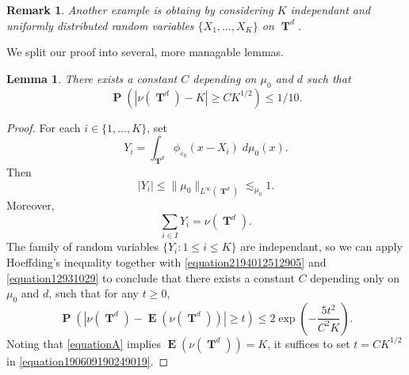 \documentclass[12pt,reqno]{article}
\numberwithin{equation}{section}
\DeclareMathOperator{\TT}{\mathbf{T}}
\newtheorem{lemma}[theorem]{Lemma}
\newtheorem*{remark}{Remark}
\DeclareMathOperator{\EE}{\mathbf{E}}
\DeclareMathOperator{\PP}{\mathbf{P}}
\begin{document}
\begin{remark}
    Another example is obtaing by considering $K$ independant and uniformly distributed random variables $\{ X_1, \dots, X_K \}$ on $\TT^d$.
\end{remark}

We split our proof into several, more managable lemmas.

\begin{lemma} \label{nuboundlemma}
    There exists a constant $C$ depending on $\mu_0$ and $d$ such that
    \[ \PP \left( |\nu(\TT^d) - K | \geq C K^{1/2} \right) \leq 1/10. \]
\end{lemma}
\begin{proof}
    For each $i \in \{ 1, \dots, K \}$, set
    \[ Y_i = \int_{\TT^d} \phi_{\varepsilon_0}(x - X_i)\; d\mu_0(x). \]
    Then
    \begin{equation} \label{equation2194012512905}
        |Y_i| \leq \| \mu_0 \|_{L^\infty(\TT^d)} \lesssim_{\mu_0} 1.
    \end{equation}
    Moreover,
    \begin{equation} \label{equation12931029}
        \sum_{i \in I} Y_i = \nu(\TT^d).
    \end{equation}
    The family of random variables $\{ Y_i : 1 \leq i \leq K \}$ are independant, so we can apply Hoeffding's inequality together with \eqref{equation2194012512905} and \eqref{equation12931029} to conclude that there exists a constant $C$ depending only on $\mu_0$ and $d$, such that for any $t \geq 0$,
    \begin{equation} \label{equation190609190249019}
        \PP \left( |\nu(\TT^d) - \EE(\nu(\TT^d))| \geq t \right) \leq 2 \exp \left( - \frac{5t^2}{C^2 K} \right).
    \end{equation}
    Noting that \eqref{equationA} implies $\EE(\nu(\TT^d)) = K$, it suffices to set $t = CK^{1/2}$ in \eqref{equation190609190249019}.
\end{proof}
\end{document}
